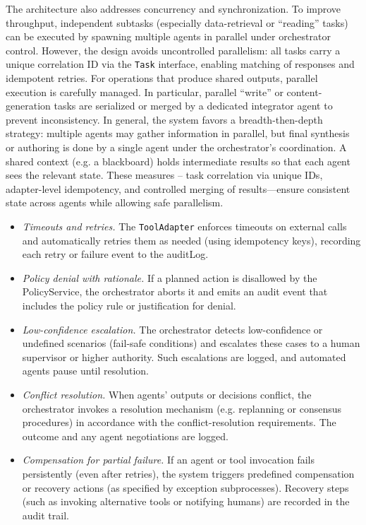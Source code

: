 The architecture also addresses concurrency and synchronization. To improve throughput, independent subtasks (especially data-retrieval or “reading” tasks) can be executed by spawning multiple agents in parallel under orchestrator control. However, the design avoids uncontrolled parallelism: all tasks carry a unique correlation ID via the \texttt{Task} interface, enabling matching of responses and idempotent retries. For operations that produce shared outputs, parallel execution is carefully managed. In particular, parallel “write” or content-generation tasks are serialized or merged by a dedicated integrator agent to prevent inconsistency. In general, the system favors a breadth-then-depth strategy: multiple agents may gather information in parallel, but final synthesis or authoring is done by a single agent under the orchestrator's coordination. A shared context (e.g. a blackboard) holds intermediate results so that each agent sees the relevant state. These measures – task correlation via unique IDs, adapter-level idempotency, and controlled merging of results---ensure consistent state across agents while allowing safe parallelism.

\begin{itemize}
\item \emph{Timeouts and retries.} The \texttt{ToolAdapter} enforces timeouts on external calls and automatically retries them as needed (using idempotency keys), recording each retry or failure event to the auditLog.
\item \emph{Policy denial with rationale.} If a planned action is disallowed by the PolicyService, the orchestrator aborts it and emits an audit event that includes the policy rule or justification for denial.
\item \emph{Low-confidence escalation.} The orchestrator detects low-confidence or undefined scenarios (fail-safe conditions) and escalates these cases to a human supervisor or higher authority. Such escalations are logged, and automated agents pause until resolution.
\item \emph{Conflict resolution.} When agents' outputs or decisions conflict, the orchestrator invokes a resolution mechanism (e.g. replanning or consensus procedures) in accordance with the conflict-resolution requirements. The outcome and any agent negotiations are logged.
\item \emph{Compensation for partial failure.} If an agent or tool invocation fails persistently (even after retries), the system triggers predefined compensation or recovery actions (as specified by exception subprocesses). Recovery steps (such as invoking alternative tools or notifying humans) are recorded in the audit trail.
\end{itemize}

